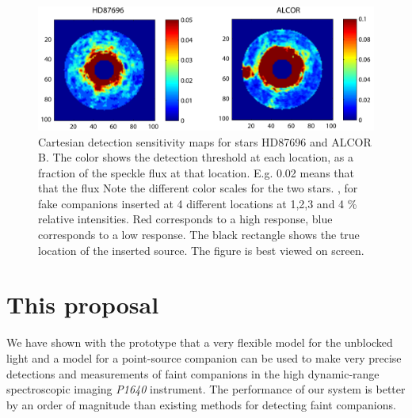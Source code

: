 \documentclass[12pt,pdftex,preprint]{aastex}
\newcommand{\project}[1]{\textsl{#1}}
\begin{document}
\begin{figure}[h!]
\begin{center}
\includegraphics[width=6in]{figs/sens_map.pdf}
\end{center}
\vspace{-7mm}
\caption{Cartesian detection sensitivity maps for stars HD87696 and ALCOR B. The
  color shows the detection threshold at each location, as a fraction
  of the speckle flux at that location. E.g. 0.02 means that that the
  flux Note the
  different color scales for the two stars. , for fake
 companions inserted at 4 different locations at 1,2,3 and 4 \%
 relative intensities. Red corresponds to a high response, blue
 corresponds to a low response. The black rectangle shows the true location of
the inserted source. The figure is best viewed on screen. }
\label{fig:sens_map}
\end{figure}

\section{This proposal}

We have shown with the prototype that a very flexible model for the
unblocked light and a model for a point-source companion can be used
to make very precise detections and measurements of faint companions
in the high dynamic-range spectroscopic imaging \project{P1640}
instrument.  The performance of our system is better by an order of
magnitude than existing methods for detecting faint companions.
\end{document}
